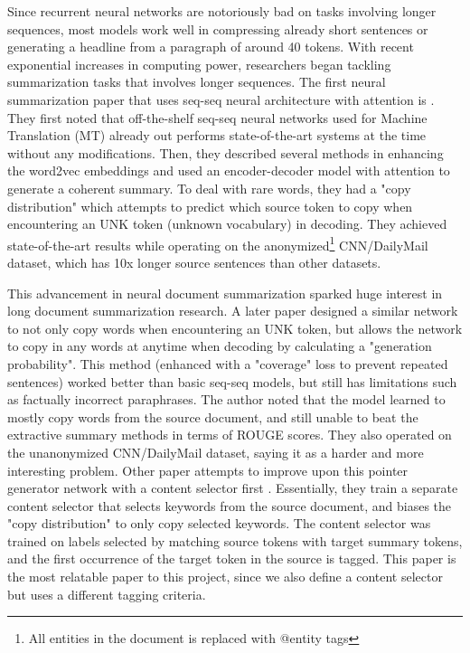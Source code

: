 \documentclass[11pt,a4paper]{article}
\begin{document}

Since recurrent neural networks are notoriously bad on tasks involving longer sequences, most models work well in compressing already short sentences or generating a headline from a paragraph of around 40 tokens. With recent exponential increases in computing power, researchers began tackling summarization tasks that involves longer sequences. The first neural summarization paper that uses seq-seq neural architecture with attention is \citet{lead}. They first noted that off-the-shelf seq-seq neural networks used for Machine Translation (MT) already out performs state-of-the-art systems at the time without any modifications. Then, they described several methods in enhancing the word2vec embeddings and used an encoder-decoder model with attention to generate a coherent summary. To deal with rare words, they had a "copy distribution" which attempts to predict which source token to copy when encountering an UNK token (unknown vocabulary) in decoding. They achieved state-of-the-art results while operating on the anonymized\footnote{All entities in the document is replaced with @entity tags} CNN/DailyMail dataset, which has 10x longer source sentences than other datasets. 

This advancement in neural document summarization sparked huge interest in long document summarization research. A later paper \cite{pointer-generator} designed a similar network to not only copy words when encountering an UNK token, but allows the network to copy in any words at anytime when decoding by calculating a "generation probability". This method (enhanced with a "coverage" loss to prevent repeated sentences) worked better than basic seq-seq models, but still has limitations such as factually incorrect paraphrases. The author noted that the model learned to mostly copy words from the source document, and still unable to beat the extractive summary methods in terms of ROUGE scores. They also operated on the unanonymized CNN/DailyMail dataset, saying it as a harder and more interesting problem. Other paper attempts to improve upon this pointer generator network with a content selector first \cite{bottom-up}. Essentially, they train a separate content selector that selects keywords from the source document, and biases the "copy distribution" to only copy selected keywords. The content selector was trained on labels selected by matching source tokens with target summary tokens, and the first occurrence of the target token in the source is tagged. This paper is the most relatable paper to this project, since we also define a content selector but uses a different tagging criteria.
\end{document}
